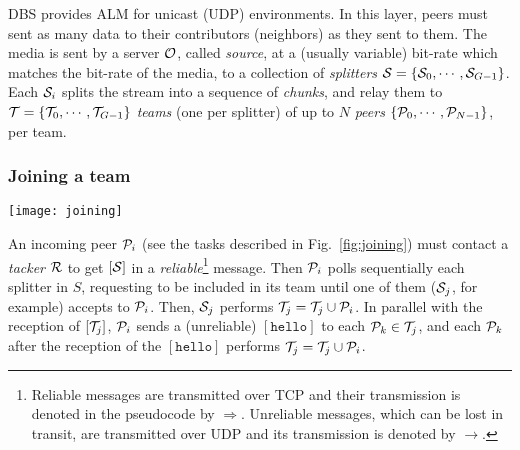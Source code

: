 DBS provides ALM for unicast (UDP) environments. {\color{red} In this
  layer, peers must sent as many data to their contributors
  (neighbors) as they sent to them.} The media is sent by a server
${\cal O}$, called \emph{source}, at a (usually variable) bit-rate
which matches the bit-rate of the media, to a collection of
\emph{splitters} ${\cal S}=\{{\cal S}_0, \cdots, {\cal
  S}_{G-1}\}$. Each ${\cal S}_i$ splits the stream into a sequence of
\emph{chunks}, and relay them to ${\cal T}=\{{\cal T}_0,\cdots,{\cal
  T}_{G-1}\}$ \emph{teams} (one per splitter) of up to $N$
\emph{peers} $\{{\cal P}_0,\cdots,{\cal P}_{N-1}\}$, per team.

\subsubsection{Joining a team}
\label{dbs:joining}
\begin{figure*}
  \texttt{[image: joining]}
  \caption{Peer joining.\label{fig:joining}}
\end{figure*}
An incoming peer ${\cal P}_i$ (see the tasks described in
Fig.~\ref{fig:joining}) must contact a \emph{tacker} ${\cal R}$ to get
$[{\cal S}]$ in a \emph{reliable}\footnote{Reliable messages are
  transmitted over TCP and their transmission is denoted in the
  pseudocode by $\Rightarrow$. Unreliable messages, which can be lost
  in transit, are transmitted over UDP and its transmission is denoted
  by $\rightarrow$.} message. Then ${\cal P}_i$ polls sequentially
each splitter in $S$, requesting to be included in its team until one
of them (${\cal S}_j$, for example) accepts to ${\cal P}_i$. Then,
${\cal S}_j$ performs ${\cal T}_j = {\cal T}_j \cup {\cal P}_i$. In
parallel with the reception of $[{\cal T}_j]$, ${\cal P}_i$ sends a
(unreliable) $[\mathtt{hello}]$ to each ${\cal P}_k\in {\cal T}_j$,
and each ${\cal P}_k$ after the reception of the $[\mathtt{hello}]$
performs ${\cal T}_j = {\cal T}_j \cup {\cal P}_i$.
